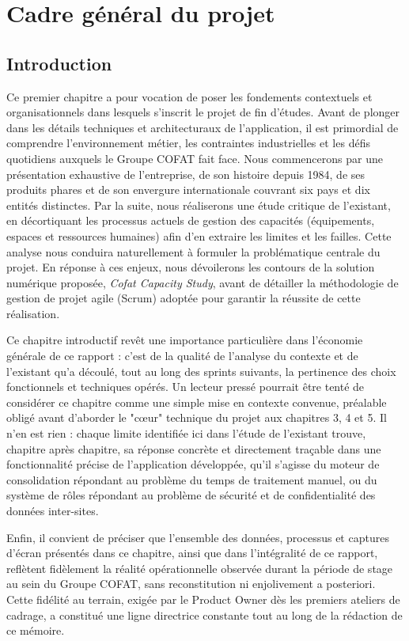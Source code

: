 \chapter{Cadre général du projet}
\label{chap:cadre_general}

\section{Introduction}
Ce premier chapitre a pour vocation de poser les fondements contextuels et organisationnels dans lesquels s'inscrit le projet de fin d'études. Avant de plonger dans les détails techniques et architecturaux de l'application, il est primordial de comprendre l'environnement métier, les contraintes industrielles et les défis quotidiens auxquels le Groupe COFAT fait face. Nous commencerons par une présentation exhaustive de l'entreprise, de son histoire depuis 1984, de ses produits phares et de son envergure internationale couvrant six pays et dix entités distinctes. Par la suite, nous réaliserons une étude critique de l'existant, en décortiquant les processus actuels de gestion des capacités (équipements, espaces et ressources humaines) afin d'en extraire les limites et les failles. Cette analyse nous conduira naturellement à formuler la problématique centrale du projet. En réponse à ces enjeux, nous dévoilerons les contours de la solution numérique proposée, \textit{Cofat Capacity Study}, avant de détailler la méthodologie de gestion de projet agile (Scrum) adoptée pour garantir la réussite de cette réalisation.

Ce chapitre introductif revêt une importance particulière dans l'économie générale de ce rapport : c'est de la qualité de l'analyse du contexte et de l'existant qu'a découlé, tout au long des sprints suivants, la pertinence des choix fonctionnels et techniques opérés. Un lecteur pressé pourrait être tenté de considérer ce chapitre comme une simple mise en contexte convenue, préalable obligé avant d'aborder le "cœur" technique du projet aux chapitres 3, 4 et 5. Il n'en est rien : chaque limite identifiée ici dans l'étude de l'existant trouve, chapitre après chapitre, sa réponse concrète et directement traçable dans une fonctionnalité précise de l'application développée, qu'il s'agisse du moteur de consolidation répondant au problème du temps de traitement manuel, ou du système de rôles répondant au problème de sécurité et de confidentialité des données inter-sites.

Enfin, il convient de préciser que l'ensemble des données, processus et captures d'écran présentés dans ce chapitre, ainsi que dans l'intégralité de ce rapport, reflètent fidèlement la réalité opérationnelle observée durant la période de stage au sein du Groupe COFAT, sans reconstitution ni enjolivement a posteriori. Cette fidélité au terrain, exigée par le Product Owner dès les premiers ateliers de cadrage, a constitué une ligne directrice constante tout au long de la rédaction de ce mémoire.

